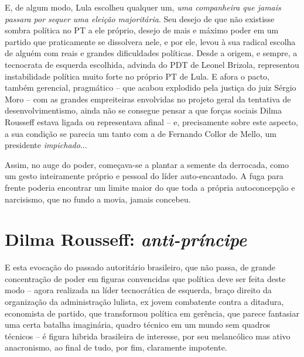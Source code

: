 E, de algum modo, Lula escolheu qualquer um, \emph{uma companheira que
jamais passara por sequer uma eleição} \emph{majoritária}. Seu desejo de
que não existisse sombra política no PT a ele próprio, desejo de mais e
máximo poder em um partido que praticamente se dissolvera nele, e por
ele, levou à sua radical escolha de alguém com reais e grandes
dificuldades políticas. Desde a origem, e sempre, a tecnocrata de
esquerda escolhida, advinda do PDT de Leonel Brizola, representou
instabilidade política muito forte no próprio PT de Lula. E afora o
pacto, também gerencial, pragmático -- que acabou explodido pela justiça
do juiz Sérgio Moro -- com as grandes empreiteiras envolvidas no projeto
geral da tentativa de desenvolvimentismo, ainda não se consegue pensar a
que forças sociais Dilma Rousseff estava ligada ou representava afinal
-- e, precisamente sobre este aspecto, a sua condição se parecia um
tanto com a de Fernando Collor de Mello, um presidente
\emph{impichado}...

Assim, no auge do poder, começava-se a plantar a semente da derrocada,
como um gesto inteiramente próprio e pessoal do líder auto-encantado. A
fuga para frente poderia encontrar um limite maior do que toda a própria
autoconcepção e narcisismo, que no fundo a movia, jamais concebeu.

  \section{Dilma Rousseff:
  \emph{anti-príncipe}}\label{dilma-rousseff-anti-pruxedncipe}

E esta evocação do passado autoritário brasileiro, que não passa, de
grande concentração de poder em figuras convencidas que política deve
ser feita deste modo -- agora realizada na líder tecnocrática de
esquerda, braço direito da organização da administração lulista, ex
jovem combatente contra a ditadura, economista de partido, que
transformou política em gerência, que parece fantasiar uma certa batalha
imaginária, quadro técnico em um mundo sem quadros técnicos -- é figura
hibrida brasileira de interesse, por seu melancólico mas ativo
anacronismo, ao final de tudo, por fim, claramente impotente.

